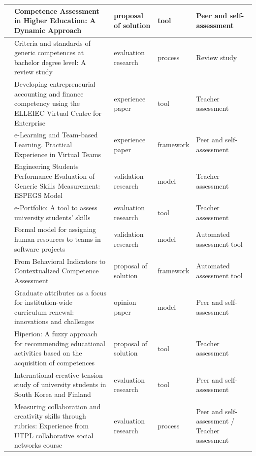 \begin{landscape}
\begin{center}
\begin{longtable}{| c | m{9cm} | m{4cm} | m{2.5cm} | m{3.5cm} |}
    \hline
    \cite{achcaoucaou2014competence} & Competence Assessment in Higher Education: A Dynamic Approach & proposal of solution & tool & Peer and self-assessment \\
    \hline
    \cite{strijbos2015criteria} & Criteria and standards of generic competences at bachelor degree level: A review study & evaluation research & process & Review study \\
    \hline
    \cite{ward2011developing} & Developing entrepreneurial accounting and finance competency using the ELLEIEC Virtual Centre for Enterprise & experience paper & tool & Teacher assessment \\
    \hline
    \cite{ficapal2015learning} & e-Learning and Team-based Learning. Practical Experience in Virtual Teams & experience paper & framework & Peer and self-assessment \\
    \hline
    \cite{rashid2008engineering} & Engineering Students Performance Evaluation of Generic Skills Measurement: ESPEGS Model & validation research & model & Teacher assessment \\
    \hline
    \cite{rodriguez2010portfolio} & e-Portfolio: A tool to assess university students' skills & evaluation research & tool & Teacher assessment \\
    \hline
    \cite{andre2011formal} & Formal model for assigning human resources to teams in software projects & validation research & model & Automated assessment tool \\
    \hline
    \cite{bedek2011behavioral} & From Behavioral Indicators to Contextualized Competence Assessment & proposal of solution & framework & Automated assessment tool \\
    \hline
    \cite{oliver2013graduate} & Graduate attributes as a focus for institution-wide curriculum renewal: innovations and challenges & opinion paper & model & Peer and self-assessment \\
    \hline
    \cite{serrano2013hiperion} & Hiperion: A fuzzy approach for recommending educational activities based on the acquisition of competences & proposal of solution & tool & Teacher assessment \\
    \hline
    \cite{chang2009international} & International creative tension study of university students in South Korea and Finland & evaluation research & tool & Peer and self-assessment \\
    \hline
    \cite{piedra2010measuring} & Measuring collaboration and creativity skills through rubrics: Experience from UTPL collaborative social networks course & evaluation research & process & Peer and self-assessment / Teacher assessment \\

\end{longtable}
\end{center}
\end{landscape}
